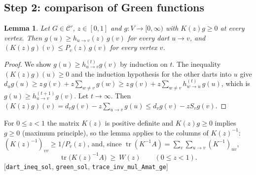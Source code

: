 \documentclass[11pt]{amsart}
\theoremstyle{plain}
\newtheorem{lemma}[theorem]{Lemma}
\theoremstyle{remark}
\newcommand{\cC}{\mathcal{C}}
\newcommand{\code}[1]{\texttt{#1}}
\DeclareMathOperator{\tr}{tr}
\begin{document}
\subsection*{Step 2: comparison of Green functions}
\begin{lemma}\label{lem:green}
Let $G\in\cC'$, $z\in[0,1]$ and $g\colon V\to[0,\infty)$ with $K(z)g\ge0$ at every vertex. Then
$g(u)\ge h_{u\to v}(z)\,g(v)$ for every dart $u\to v$, and $(K(z)g)(v)\le P_v(z)\,g(v)$ for every vertex $v$.
\end{lemma}
\begin{proof}
We show $g(u)\ge h^{(t)}_{u\to v}g(v)$ by induction on $t$. The inequality $(K(z)g)(u)\ge0$ and the induction
hypothesis for the other darts into $u$ give
$d_ug(u)\ge z\,g(v)+z\sum_{w\ne v}g(w)\ge z\,g(v)+z\sum_{w\ne v}h^{(t)}_{w\to u}\,g(u)$, which is
$g(u)\ge h^{(t+1)}_{u\to v}g(v)$. Let $t\to\infty$. Then
$(K(z)g)(v)=d_vg(v)-z\sum_{u\to v}g(u)\le d_vg(v)-zS_vg(v)$.
\end{proof}
For $0\le z<1$ the matrix $K(z)$ is positive definite and $K(z)g\ge0$ implies $g\ge0$ (maximum principle), so the
lemma applies to the columns of $K(z)^{-1}$: $(K(z)^{-1})_{vv}\ge1/P_v(z)$, and, since
$\tr(K^{-1}A)=\sum_v\sum_{u\to v}(K^{-1})_{uv}$,
\begin{equation}\label{eq:trace}
  \tr\bigl(K(z)^{-1}A\bigr)\ \ge\ W(z)\qquad(0\le z<1).
\end{equation}
[\code{dart\_ineq\_sol}, \code{green\_sol}, \code{trace\_inv\_mul\_Amat\_ge}]
\end{document}
